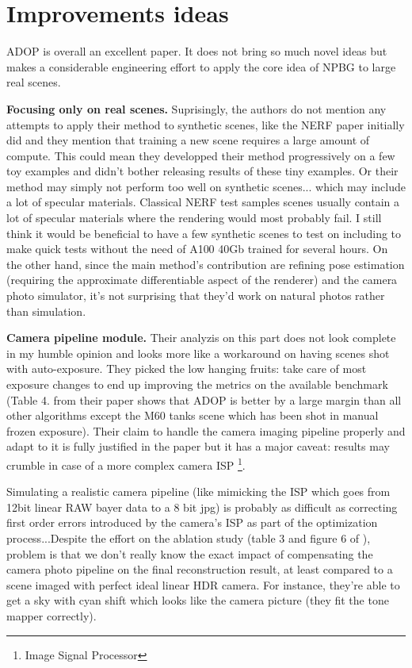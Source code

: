 \section{Improvements ideas}
\label{sec:discussion}
ADOP\cite{ruckert2022adop} is overall an excellent paper. It does not bring so much novel ideas but makes a considerable engineering effort to apply the core idea of NPBG \cite{Aliev2020} to large real scenes.

\noindent \textbf{Focusing only on real scenes.}
Suprisingly, the authors do not mention any attempts to apply their method to synthetic scenes, like the NERF paper initially did and they mention that training a new scene requires a large amount of compute. This could mean they developped their method progressively on a few toy examples and didn't bother releasing results of these tiny examples. Or their method may simply not perform too well on synthetic scenes... which may include a lot of specular materials. Classical NERF test samples scenes usually contain a lot of specular materials where the rendering would most probably fail. I still think it would be beneficial to have a few synthetic scenes to test on including to make quick tests without the need of A100 40Gb trained for several hours.
On the other hand, since the main method's contribution are refining pose estimation (requiring the approximate differentiable aspect of the renderer) and the camera photo simulator, it's not surprising that they'd work on natural photos rather than simulation. 

\noindent \textbf{Camera pipeline module.} 
Their analyzis on this part does not look complete in my humble opinion and looks more like a workaround on having scenes shot with auto-exposure. They picked the low hanging fruits: take care of most exposure changes to end up improving the metrics on the available benchmark (Table 4. from their paper shows that ADOP is better by a large margin than all other algorithms except the M60 tanks scene which has been shot in manual frozen exposure). Their claim to handle the camera imaging pipeline properly and adapt to it is fully justified in the paper but it has a major caveat: results may crumble in case of a more complex camera ISP \footnote{Image Signal Processor}.

Simulating a realistic camera pipeline (like mimicking the ISP which goes from 12bit linear RAW bayer data to a 8 bit jpg) is probably as difficult as correcting first order errors introduced by the camera's ISP as part of the optimization process...Despite the effort on the ablation study (table 3 and figure 6 of \cite{ruckert2022adop}), problem is that we don't really know the exact impact of compensating the camera photo pipeline on the final reconstruction result, at least compared to a scene imaged with perfect ideal linear HDR camera. For instance, they're able to get a sky with cyan shift which looks like the camera picture (they fit the tone mapper correctly).

